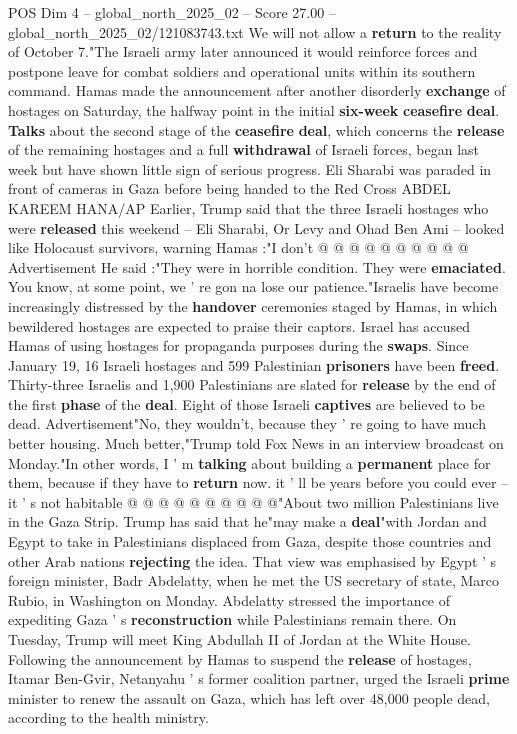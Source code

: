 \begin{textsample}{POS Dim 4 – global\_north\_2025\_02 – Score 27.00 – global\_north\_2025\_02/121083743.txt}
We will not allow a \textbf{return} to the reality of October 7."The Israeli army later announced it would reinforce forces and postpone leave for combat soldiers and operational units within its southern command.
Hamas made the announcement after another disorderly \textbf{exchange} of hostages on Saturday, the halfway point in the initial \textbf{six-week} \textbf{ceasefire} \textbf{deal}. \textbf{Talks} about the second stage of the \textbf{ceasefire} \textbf{deal}, which concerns the \textbf{release} of the remaining hostages and a full \textbf{withdrawal} of Israeli forces, began last week but have shown little sign of serious progress.
Eli Sharabi was paraded in front of cameras in Gaza before being handed to the Red Cross ABDEL KAREEM HANA/AP Earlier, Trump said that the three Israeli hostages who were \textbf{released} this weekend -- Eli Sharabi, Or Levy and Ohad Ben Ami -- looked like Holocaust survivors, warning Hamas :"I don't @ @ @ @ @ @ @ @ @ @ Advertisement He said :"They were in horrible condition.
They were \textbf{emaciated}.
You know, at some point, we ' re gon na lose our patience."Israelis have become increasingly distressed by the \textbf{handover} ceremonies staged by Hamas, in which bewildered hostages are expected to praise their captors.
Israel has accused Hamas of using hostages for propaganda purposes during the \textbf{swaps}.
Since January 19, 16 Israeli hostages and 599 Palestinian \textbf{prisoners} have been \textbf{freed}.
Thirty-three Israelis and 1,900 Palestinians are slated for \textbf{release} by the end of the first \textbf{phase} of the \textbf{deal}.
Eight of those Israeli \textbf{captives} are believed to be dead.
Advertisement"No, they wouldn't, because they ' re going to have much better housing.
Much better,"Trump told Fox News in an interview broadcast on Monday."In other words, I ' m \textbf{talking} about building a \textbf{permanent} place for them, because if they have to \textbf{return} now. it ' ll be years before you could ever -- it ' s not habitable @ @ @ @ @ @ @ @ @ @"About two million Palestinians live in the Gaza Strip.
Trump has said that he"may make a \textbf{deal}"with Jordan and Egypt to take in Palestinians displaced from Gaza, despite those countries and other Arab nations \textbf{rejecting} the idea.
That view was emphasised by Egypt ' s foreign minister, Badr Abdelatty, when he met the US secretary of state, Marco Rubio, in Washington on Monday.
Abdelatty stressed the importance of expediting Gaza ' s \textbf{reconstruction} while Palestinians remain there.
On Tuesday, Trump will meet King Abdullah II of Jordan at the White House.
Following the announcement by Hamas to suspend the \textbf{release} of hostages, Itamar Ben-Gvir, Netanyahu ' s former coalition partner, urged the Israeli \textbf{prime} minister to renew the assault on Gaza, which has left over 48,000 people dead, according to the health ministry.

\end{textsample}
